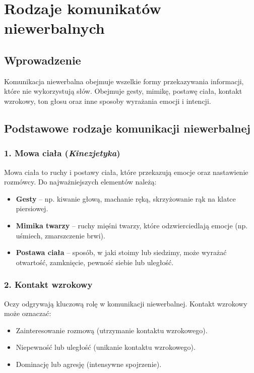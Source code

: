 \section{Rodzaje komunikatów niewerbalnych}

\subsection{Wprowadzenie}
Komunikacja niewerbalna obejmuje wszelkie formy przekazywania informacji, które nie wykorzystują słów. Obejmuje gesty, mimikę, postawę ciała, kontakt wzrokowy, ton głosu oraz inne sposoby wyrażania emocji i intencji.

\subsection{Podstawowe rodzaje komunikacji niewerbalnej}

\subsubsection{1. Mowa ciała (\textit{Kinezjetyka})}
Mowa ciała to ruchy i postawy ciała, które przekazują emocje oraz nastawienie rozmówcy. Do najważniejszych elementów należą:
\begin{itemize}
    \item \textbf{Gesty} – np. kiwanie głową, machanie ręką, skrzyżowanie rąk na klatce piersiowej.
    \item \textbf{Mimika twarzy} – ruchy mięśni twarzy, które odzwierciedlają emocje (np. uśmiech, zmarszczenie brwi).
    \item \textbf{Postawa ciała} – sposób, w jaki stoimy lub siedzimy, może wyrażać otwartość, zamknięcie, pewność siebie lub uległość.
\end{itemize}

\subsubsection{2. Kontakt wzrokowy}
Oczy odgrywają kluczową rolę w komunikacji niewerbalnej. Kontakt wzrokowy może oznaczać:
\begin{itemize}
    \item Zainteresowanie rozmową (utrzymanie kontaktu wzrokowego).
    \item Niepewność lub uległość (unikanie kontaktu wzrokowego).
    \item Dominację lub agresję (intensywne spojrzenie).
\end{itemize}

